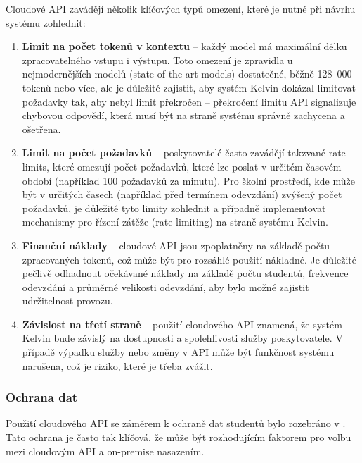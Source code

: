 Cloudové API zavádějí několik klíčových typů omezení, které je nutné při návrhu systému zohlednit:

\begin{enumerate}
    \item \textbf{Limit na počet tokenů v kontextu} -- každý model má maximální délku zpracovatelného vstupu i výstupu.
    Toto omezení je zpravidla u nejmodernějších modelů (state-of-the-art models) dostatečné, běžně 128~000 tokenů nebo více, ale je důležité zajistit, aby systém Kelvin dokázal limitovat požadavky tak, aby nebyl limit překročen -- překročení limitu API signalizuje chybovou odpovědí, která musí být na straně systému správně zachycena a ošetřena.

    \item \textbf{Limit na počet požadavků} -- poskytovatelé často zavádějí takzvané rate limits, které omezují počet požadavků, které lze poslat v určitém časovém období (například 100 požadavků za minutu).
    Pro školní prostředí, kde může být v určitých časech (například před termínem odevzdání) zvýšený počet požadavků, je důležité tyto limity zohlednit a případně implementovat mechanismy pro řízení zátěže (rate limiting) na straně systému Kelvin\@.

    \item \textbf{Finanční náklady} -- cloudové API jsou zpoplatněny na základě počtu zpracovaných tokenů, což může být pro rozsáhlé použití nákladné.
    Je důležité pečlivě odhadnout očekávané náklady na základě počtu studentů, frekvence odevzdání a průměrné velikosti odevzdání, aby bylo možné zajistit udržitelnost provozu.

    \item \textbf{Závislost na třetí straně} -- použití cloudového API znamená, že systém Kelvin bude závislý na dostupnosti a spolehlivosti služby poskytovatele.
    V případě výpadku služby nebo změny v API může být funkčnost systému narušena, což je riziko, které je třeba zvážit.
\end{enumerate}

\subsubsection*{Ochrana dat}
\label{subsubsec:deployment-cloud-data-protection}

Použití cloudového API se záměrem k ochraně dat studentů bylo rozebráno v .
Tato ochrana je často tak klíčová, že může být rozhodujícím faktorem pro volbu mezi cloudovým API a on-premise nasazením.

